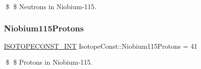 \$ \$ Neutrons in Niobium-\/115. \mbox{\label{group___isotope_const-_niobium-_nb115_ga7adea44e10129271b340bfbc20749b19}} 
\subsubsection{\texorpdfstring{Niobium115\+Protons}{Niobium115Protons}}
{\footnotesize\ttfamily \mbox{\hyperlink{group___isotope_const-_macros_ga5f18360b3e99483a35c32d789e62621c}{I\+S\+O\+T\+O\+P\+E\+C\+O\+N\+S\+T\+\_\+\+I\+NT}} Isotope\+Const\+::\+Niobium115\+Protons = 41}

\$ \$ Protons in Niobium-\/115. 